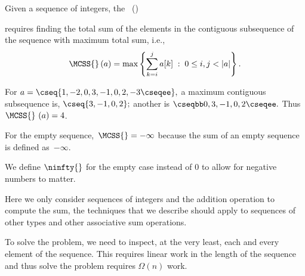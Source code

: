 %
\begin{flex}
\begin{definition}
\label{def:mcss::introduction::mcss-problem}
Given a sequence of integers,
%
the~ (\MCSS{})

%
requires finding
the total sum of the elements in the contiguous subsequence of the
sequence with maximum total sum, i.e.,
%
  \begin{eqnarray*}
    \MCSS{}\,(a) = \max \left\{ \sum_{k=i}^j a[k] \;:\; 0 \leq i,j <
      |a| \right\}.
  \end{eqnarray*}
%
\end{definition}

\begin{example}
For $a = \cseq{1, -2, 0, 3, -1, 0, 2, -3 \cseqee},$ a maximum contiguous
subsequence is, $\cseq{3, -1, 0, 2};$ 
%
another is $\cseqbb 0, 3, -1, 0, 2 \cseqee.$
%
Thus $\MCSS{}~(a) = 4$.

For the empty sequence,~$\MCSS{} = -\infty$ because the sum of an
empty sequence is defined as~$-\infty$.
\end{example}
\end{flex}

\begin{teachnote}
We define $\ninfty{}$ for the empty case instead of $0$ to allow for
negative numbers to matter.
\end{teachnote}

%
\begin{note}
Here we only consider sequences of integers and the addition operation
to compute the sum, the techniques that we describe should apply to
sequences of other types and other associative sum operations.
\end{note}


\begin{gram}
To solve the \MCSS{} problem, we need to inspect, at the very least, each and  every element of the sequence.  This requires linear work in the length of the sequence and thus   solve the \MCSS{} problem requires $\Omega(n)$  work.
\end{gram}


